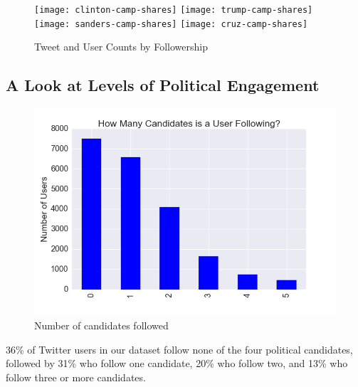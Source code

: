 \begin{figure}[H] 
\centering 
 \texttt{[image: clinton-camp-shares]}
 \texttt{[image: trump-camp-shares]}  
 \texttt{[image: sanders-camp-shares]}  
 \texttt{[image: cruz-camp-shares]}  
  \caption{Tweet and User Counts by Followership
    \label{fig:users-tweets-by-candid}}
\end{figure}
 
\subsection{A Look at Levels of Political Engagement}






\begin{figure}[H]  
\centering 
  \includegraphics[width=1.0\textwidth]{candid-ct}  
  \caption{Number of candidates followed
    \label{fig:candid-ct}}
\end{figure}

36\% of Twitter users in our dataset follow none of the four political candidates, followed by 31\% who follow one candidate, 20\% who follow two, and 13\% who follow three or more candidates. 


